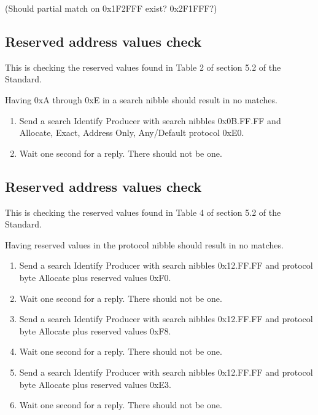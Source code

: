 (Should partial match on 0x1F2FFF exist?  0x2F1FFF?)

\subsection{Reserved address values check}

This is checking the reserved values found in Table 2 of section 5.2 of the Standard.

Having 0xA through 0xE in a search nibble should result in no matches.

\begin{enumerate}

\item Send a search Identify Producer with search nibbles 0x0B.FF.FF and 
    Allocate, Exact, Address Only, Any/Default protocol 0xE0.

\item Wait one second for a reply.  There should not be one.

\end{enumerate}

\subsection{Reserved address values check}

This is checking the reserved values found in Table 4 of section 5.2 of the Standard.

Having reserved values in the protocol nibble should result in no matches.

\begin{enumerate}

\item Send a search Identify Producer with search nibbles 0x12.FF.FF and 
    protocol byte Allocate plus reserved values 0xF0.

\item Wait one second for a reply.  There should not be one.

\item Send a search Identify Producer with search nibbles 0x12.FF.FF and 
    protocol byte Allocate plus reserved values 0xF8.

\item Wait one second for a reply.  There should not be one.

\item Send a search Identify Producer with search nibbles 0x12.FF.FF and 
    protocol byte Allocate plus reserved values 0xE3.

\item Wait one second for a reply.  There should not be one.

\end{enumerate}

  
